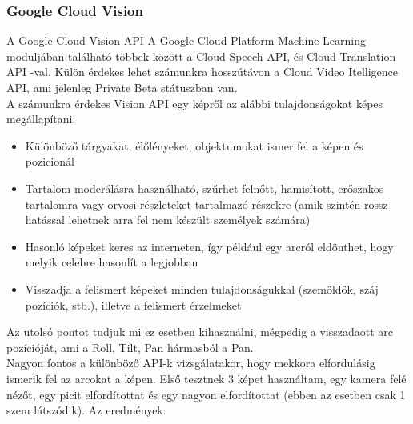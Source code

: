 \subsubsection{Google Cloud Vision}
A Google Cloud Vision API \cite{GoogleCloudVision} A Google Cloud Platform Machine Learning moduljában található többek között a Cloud Speech API, és Cloud Translation API -val. Külön érdekes lehet számunkra hosszútávon a Cloud Video Itelligence API, ami jelenleg Private Beta státuszban van.
\\A számunkra érdekes Vision API egy képről az alábbi tulajdonságokat képes megállapítani:
\begin{itemize}
\item Különböző tárgyakat, élőlényeket, objektumokat ismer fel a képen és pozicionál
\item Tartalom moderálásra használható, szűrhet felnőtt, hamisított, erőszakos tartalomra vagy orvosi részleteket tartalmazó részekre (amik szintén rossz hatással lehetnek arra fel nem készült személyek számára)
\item Hasonló képeket keres az interneten, így például egy arcról eldönthet, hogy melyik celebre hasonlít a legjobban
\item Visszadja a felismert képeket minden tulajdonságukkal (szemöldök, száj pozíciók, stb.), illetve a felismert érzelmeket
\end{itemize}

Az utolsó pontot tudjuk mi ez esetben kihasználni, mégpedig a visszadaott arc pozícióját, ami a Roll, Tilt, Pan hármasból a Pan.
\\Nagyon fontos a különböző API-k vizsgálatakor, hogy mekkora elfordulásig ismerik fel az arcokat a képen. Első tesztnek 3 képet használtam, egy kamera felé nézőt, egy picit elfordítottat és egy nagyon elfordítottat (ebben az esetben csak 1 szem látszódik).
Az eredmények: \\

